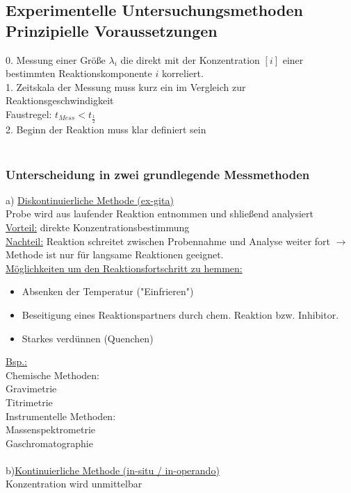 \documentclass[a4paper, fleqn]{article}
\begin{document}
\subsection{Experimentelle Untersuchungsmethoden Prinzipielle Voraussetzungen}
0. Messung einer Größe $\lambda_i$ die direkt mit der Konzentration $[i]$ einer bestimmten Reaktionskomponente $i$ korreliert.\\
1. Zeitskala der Messung muss kurz ein im Vergleich zur Reaktionsgeschwindigkeit\\
Faustregel: $t_{Mess} < t_\frac{1}{2}$\\
2. Beginn der Reaktion muss klar definiert sein\\\\

\subsubsection{Unterscheidung in zwei grundlegende Messmethoden}
a) \underline{Diskontinuierliche Methode (ex-gita)}\\
Probe wird aus laufender Reaktion entnommen und shließend analysiert\\
\underline{Vorteil:} direkte Konzentrationsbestimmung\\
\underline{Nachteil:} Reaktion schreitet zwischen Probennahme und Analyse weiter fort $\rightarrow$ Methode ist nur für langsame Reaktionen geeignet.\\
\underline{Möglichkeiten um den Reaktionsfortschritt zu hemmen:}\\
\begin{itemize}
    \item Absenken der Temperatur ("Einfrieren")
    \item Beseitigung eines Reaktionspartners durch chem. Reaktion bzw. Inhibitor.
    \item Starkes verdünnen (Quenchen)
\end{itemize}
\underline{Bsp.:}\\
Chemische Methoden:\\
Gravimetrie\\
Titrimetrie\\
Instrumentelle Methoden:\\
Massenspektrometrie\\
Gaschromatographie\\\\

b)\underline{Kontinuierliche Methode (in-situ / in-operando)}\\
Konzentration wird unmittelbar
\end{document}
